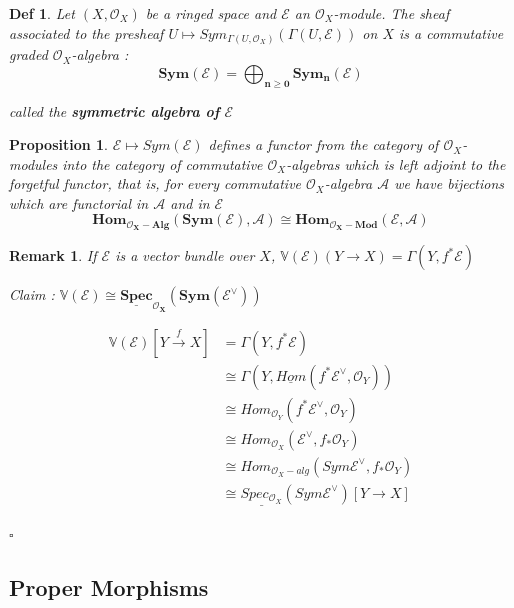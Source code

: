 \documentclass{article}
\newtheorem{definition}[theorem]{Def}
\newtheorem{proposition}[theorem]{Proposition}
\newtheorem{remark}[theorem]{Remark}
\newenvironment{Proof}{{\noindent \indent \it Proof:\quad}}{\hfill $\square$\par}
\begin{document}
\begin{definition}
    Let $(X,\mathcal O_X)$ be a ringed space and $\mathcal E$ an $\mathcal O_X$-module. The sheaf associated
to the presheaf $U \mapsto Sym_{\Gamma(U,\mathcal O_X)}(\Gamma(U, \mathcal E ))$ on $X$ is a commutative graded $\mathcal O_X$-algebra :
$$
\bm{Sym(\mathcal E) =\bigoplus_{n\geq0}
Sym_n(\mathcal E)}
$$

called the \textbf{symmetric algebra of} $\bm{\mathcal E}$
\end{definition}

\begin{proposition}
$\mathcal E \mapsto Sym(\mathcal E )$ defines a functor from the category
of $\mathcal O_X$-modules into the category of commutative $\mathcal O_X$-algebras which is left adjoint to the
forgetful functor, that is, for every commutative $\mathcal O_X$-algebra $\mathcal A$ we have bijections which
are functorial in $\mathcal A$ and in $\mathcal E$
$$
\bm{Hom_{\mathcal O_X-Alg}(Sym(\mathcal E), \mathcal A) \cong Hom_{\mathcal O_X-Mod}(\mathcal E,\mathcal A)}
$$
\end{proposition}

\begin{remark}
    If $\mathcal E$ is a vector bundle over $X$, $\mathbb V(\mathcal E)(Y\to X)=\Gamma(Y,f^\ast\mathcal E)$

    Claim : $\bm{\mathbb V(\mathcal E)\cong\underline{Spec}_{\mathcal O_X}(Sym(\mathcal E^\vee))}$
\end{remark}
\begin{Proof}
\begin{align*}
\label{sup}
\mathbb V(\mathcal E)[Y\xrightarrow{f}X]
&=
\Gamma(Y,f^\ast\mathcal E)
\\
&\cong
\Gamma(Y,\underline{Hom}(f^\ast\mathcal E^\vee,\mathcal O_Y))
\\
&\cong
Hom_{\mathcal O_Y}(f^\ast\mathcal E^\vee, \mathcal O_Y)
\\
&\cong
Hom_{\mathcal O_X}(\mathcal E^\vee,f_\ast\mathcal O_Y)
\\
&\cong
Hom_{\mathcal O_X-alg}(Sym\mathcal E^\vee,f_\ast\mathcal O_Y)
\\
&\cong
\underline{Spec_{\mathcal O_X}}(Sym\mathcal E^\vee)[Y\to X]
\end{align*}
    
\end{Proof}





\newpage
\subsection{Proper Morphisms}
\end{document}
